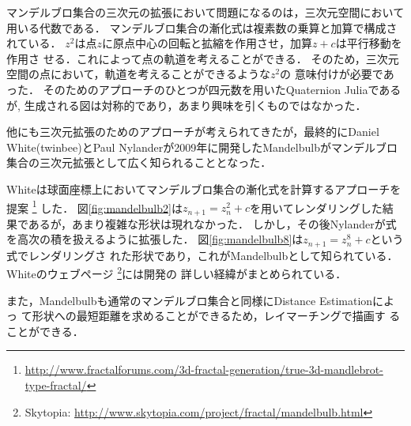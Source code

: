 マンデルブロ集合の三次元の拡張において問題になるのは，三次元空間において
用いる代数である．
マンデルブロ集合の漸化式は複素数の乗算と加算で構成されている．
$z^2$は点$z$に原点中心の回転と拡縮を作用させ，加算$z + c$は平行移動を作用さ
せる．これによって点の軌道を考えることができる．
そのため，三次元空間の点において，軌道を考えることができるような$z^2$の
意味付けが必要であった．
そのためのアプローチのひとつが四元数を用いたQuaternion Juliaであるが,
生成される図は対称的であり，あまり興味を引くものではなかった．

他にも三次元拡張のためのアプローチが考えられてきたが，最終的にDaniel
White(twinbee)とPaul Nylanderが2009年に開発したMandelbulbがマンデルブロ
集合の三次元拡張として広く知られることとなった．

Whiteは球面座標上においてマンデルブロ集合の漸化式を計算するアプローチを提案
\footnote{\url{http://www.fractalforums.com/3d-fractal-generation/true-3d-mandlebrot-type-fractal/}}
した．
図\ref{fig:mandelbulb2}は$z_{n+1} = z_n^2 + c$を用いてレンダリングした結
果であるが，あまり複雑な形状は現れなかった．
しかし，その後Nylanderが式を高次の積を扱えるように拡張した．
図\ref{fig:mandelbulb8}は$z_{n+1} = z_n^8 + c $という式でレンダリングさ
れた形状であり，これがMandelbulbとして知られている．Whiteのウェブページ
\footnote{Skytopia:
\url{http://www.skytopia.com/project/fractal/mandelbulb.html}}には開発の
詳しい経緯がまとめられている．

また，Mandelbulbも通常のマンデルブロ集合と同様にDistance Estimationによっ
て形状への最短距離を求めることができるため，レイマーチングで描画す
ることができる．

